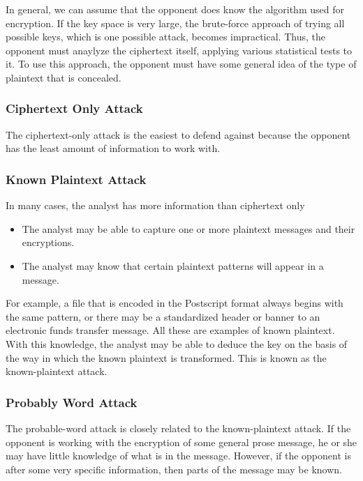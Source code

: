 \documentclass[11pt]{article}
\begin{document}
In general, we can assume that the opponent does know the algorithm used for encryption. If the key space is very large, the brute-force approach of trying all possible keys, which is one possible attack, becomes impractical. Thus, the opponent must anaylyze the ciphertext itself, applying various statistical tests to it. To use this approach, the opponent must have some general idea of the type of plaintext that is concealed.

\subsubsection{Ciphertext Only Attack}
The ciphertext-only attack is the easiest to defend against because the opponent has the least amount of information to work with.

\subsubsection{Known Plaintext Attack}
In many cases, the analyst has more information than ciphertext only
\begin{itemize}
    \item The analyst may be able to capture one or more plaintext messages and their encryptions.
    \item The analyst may know that certain plaintext patterns will appear in a message.
\end{itemize}

For example, a file that is encoded in the Postscript format always begins with the same pattern, or there may be a standardized header or banner to an electronic funds transfer message. All these are examples of known plaintext. With this knowledge, the analyst may be able to deduce the key on the basis of the way in which the known plaintext is transformed. This is known as the known-plaintext attack.

\subsubsection{Probably Word Attack}

The probable-word attack is closely related to the known-plaintext attack. If the opponent is working with the encryption of some general prose message, he or she may have little knowledge of what is in the message. However, if the opponent is after some very specific information, then parts of the message may be known.\\
\end{document}
